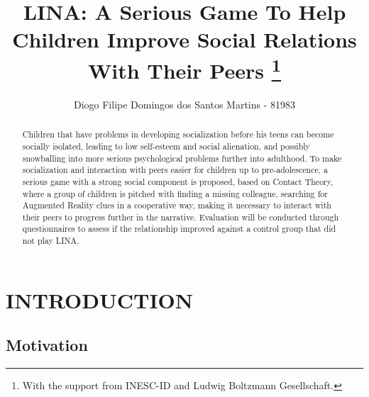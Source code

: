 \documentclass[runningheads]{llncs}
\begin{document}
\title{LINA: A Serious Game To Help Children Improve Social Relations With Their Peers \thanks{With the support from INESC-ID and Ludwig Boltzmann Gesellschaft.}}


\author{Diogo Filipe Domingos dos Santos Martins - 81983}



\maketitle              %

\begin{abstract}
Children that have problems in developing socialization before his teens can become socially isolated, leading to low self-esteem and social alienation, and possibly snowballing into more serious psychological problems further into adulthood. To make socialization and interaction with peers easier for children up to pre-adolescence, a serious game with a strong social component is proposed, based on Contact Theory, where a group of children is pitched with finding a missing colleague, searching for Augmented Reality clues in a cooperative way, making it necessary to interact with their peers to progress further in the narrative. Evaluation will be conducted through questionnaires to assess if the relationship improved against a control group that did not play LINA. 

\end{abstract}
%
%
%

\section{INTRODUCTION}

\subsection{Motivation}
\end{document}
